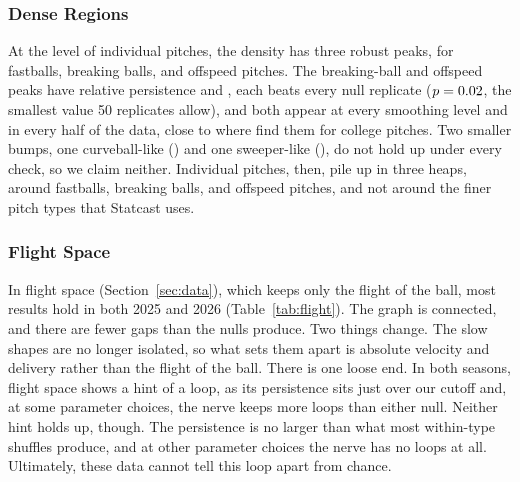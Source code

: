 \documentclass[11pt]{article}
\theoremstyle{definition}
\theoremstyle{remark}
\begin{document}
\subsubsection{Dense Regions}
At the level of individual pitches, the density has three robust peaks, for fastballs, breaking balls, and offspeed pitches.
The breaking-ball and offspeed peaks have relative persistence \PeakBB{} and \PeakCH, each beats every null replicate ($p = 0.02$, the smallest value 50 replicates allow), and both appear at every smoothing level and in every half of the data, close to where \textcite{maloof2026classify} find them for college pitches.
Two smaller bumps, one curveball-like (\PeakCurve) and one sweeper-like (\PeakSweep), do not hold up under every check, so we claim neither.
Individual pitches, then, pile up in three heaps, around fastballs, breaking balls, and offspeed pitches, and not around the finer pitch types that Statcast uses.

\subsubsection{Flight Space}
In flight space (Section~\ref{sec:data}), which keeps only the flight of the ball, most results hold in both 2025 and 2026 (Table~\ref{tab:flight}). The graph is connected, and there are fewer gaps than the nulls produce.
Two things change. The slow shapes are no longer isolated, so what sets them apart is absolute velocity and delivery rather than the flight of the ball.
There is one loose end. In both seasons, flight space shows a hint of a loop, as its persistence sits just over our cutoff and, at some parameter choices, the nerve keeps more loops than either null. 
Neither hint holds up, though. The persistence is no larger than what most within-type shuffles produce, and at other parameter choices the nerve has no loops at all. Ultimately, these data cannot tell this loop apart from chance.
\end{document}
